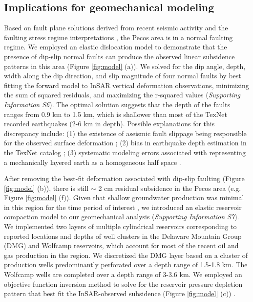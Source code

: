 \documentclass[draft]{agujournal2019}
\begin{document}
\subsection{Implications for geomechanical modeling}
Based on fault plane solutions derived from recent seismic activity and the faulting stress regime interpretations \cite{LundSnee2018}, the Pecos area is in a normal faulting regime. We employed an elastic dislocation model \cite{Okada1992} to demonstrate that the presence of dip-slip normal faults can produce the observed linear subsidence patterns in this area (Figure \ref{fig:model} (a)). We solved for the dip angle, depth, width along the dip direction, and slip magnitude of four normal faults by best fitting the forward model to InSAR vertical deformation observations, minimizing the sum of squared residuals, and maximizing the r-squared values \cite{Du1992} (\textit{Supporting Information S6}). The optimal solution suggests that the depth of the faults ranges from 0.9 km to 1.5 km, which is shallower than most of the TexNet recorded earthquakes (2-6 km in depth). Possible explanations for this discrepancy include: (1) the existence of aseismic fault slippage being responsible for the observed surface deformation \cite{mcgarr2018injection}; (2) bias in earthquake depth estimation in the TexNet catalog \cite{Lomax2019}; (3) systematic modeling errors associated with representing a mechanically layered earth as a homogeneous half space \cite{Du1992}. 

 After removing the best-fit deformation associated with dip-slip faulting (Figure \ref{fig:model} (b)), there is still $\sim$ 2 cm residual subsidence in the Pecos area (e.g. Figure \ref{fig:model} (f)). Given that shallow groundwater production was minimal in this region for the time period of interest \cite{deng2020surface}, we introduced an elastic reservoir compaction model \cite{Geertsma1973} to our geomechanical analysis (\textit{Supporting Information S7}). We implemented two layers of multiple cylindrical reservoirs corresponding to reported locations and depths of well clusters in the Delaware Mountain Group (DMG) and Wolfcamp reservoirs, which account for most of the recent oil and gas production in the region. We discretized the DMG layer based on a cluster of production wells predominantly perforated over a depth range of 1.5-1.8 km. The Wolfcamp wells are completed over a depth range of 3-3.6 km. We employed an objective function inversion method to solve for the reservoir pressure depletion pattern that best fit the InSAR-observed subsidence (Figure \ref{fig:model} (c)) \cite{Du2001}.
\end{document}
